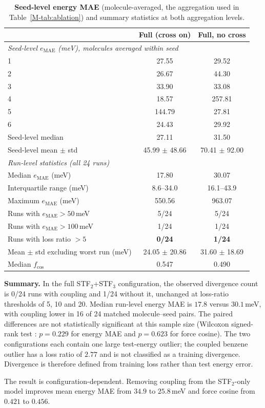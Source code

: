 \begin{table}[!htbp]
\centering
\caption{\textbf{Seed-level energy MAE} (molecule-averaged, the aggregation used in Table~\ref{M-tab:ablation}) and summary statistics at both aggregation levels.}
\label{tab:cross_summary}
\setlength{\tabcolsep}{6pt}
\begin{tabular}{lcc}
\toprule
& \textbf{Full (cross on)} & \textbf{Full, no cross} \\
\midrule
\multicolumn{3}{l}{\emph{Seed-level $e_\mathrm{MAE}$ (meV), molecules averaged within seed}} \\
1 & 27.55 & 29.52 \\
2 & 26.67 & 44.30 \\
3 & 33.90 & 33.08 \\
4 & 18.57 & 257.81 \\
5 & 144.79 & 27.81 \\
6 & 24.43 & 29.92 \\
\midrule
Seed-level median   & 27.11 & 31.50 \\
Seed-level mean $\pm$ std & 45.99 $\pm$ 48.66 & 70.41 $\pm$ 92.00 \\
\midrule
\multicolumn{3}{l}{\emph{Run-level statistics (all 24 runs)}} \\
Median $e_\mathrm{MAE}$ (meV)      & 17.80 & 30.07 \\
Interquartile range (meV)          & 8.6--34.0 & 16.1--43.9 \\
Maximum $e_\mathrm{MAE}$ (meV)     & 550.56 & 963.07 \\
Runs with $e_\mathrm{MAE} > 50$\,meV   & 5/24 & 5/24 \\
Runs with $e_\mathrm{MAE} > 100$\,meV  & 1/24 & 1/24 \\
Runs with loss ratio $> 5$         & \textbf{0/24} & \textbf{1/24} \\
Mean $\pm$ std excluding worst run (meV) & 24.05 $\pm$ 20.86 & 31.60 $\pm$ 18.69 \\
Median $f_\mathrm{cos}$            & 0.547 & 0.490 \\
\bottomrule
\end{tabular}
\end{table}

\FloatBarrier

\textbf{Summary.} In the full STF$_2$+STF$_3$ configuration, the observed divergence count is 0/24 runs with coupling and 1/24 without it, unchanged at loss-ratio thresholds of 5, 10 and 20. Median run-level energy MAE is $17.8$ versus $30.1$\,meV, with coupling lower in 16 of 24 matched molecule--seed pairs. The paired differences are not statistically significant at this sample size (Wilcoxon signed-rank test \citep{wilcoxon1945ranking}: $p=0.229$ for energy MAE and $p=0.623$ for force cosine). The two configurations each contain one large test-energy outlier; the coupled benzene outlier has a loss ratio of $2.77$ and is not classified as a training divergence. Divergence is therefore defined from training loss rather than test energy error.

The result is configuration-dependent. Removing coupling from the STF$_2$-only model improves mean energy MAE from $34.9$ to $25.8$\,meV and force cosine from $0.421$ to $0.456$.
